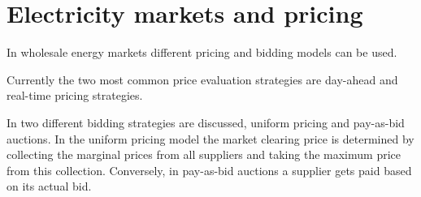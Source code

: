 \section{Electricity markets and pricing}

In wholesale energy markets different pricing and bidding models can be used. 

Currently the two most common price evaluation strategies are day-ahead and real-time pricing strategies. 

In \cite{uniform2008tierney} two different bidding strategies are discussed, uniform pricing and pay-as-bid auctions. In the uniform pricing model the market clearing price is determined by collecting the marginal prices from all suppliers and taking the maximum price from this collection. Conversely, in pay-as-bid auctions a supplier gets paid based on its actual bid. 

